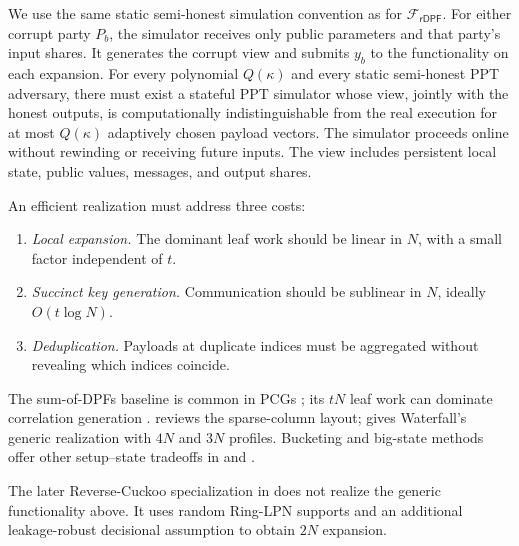 We use the same static semi-honest simulation convention as for
$\mathcal F_{\mathsf{rDPF}}$.  For either corrupt party $P_b$, the simulator
receives only public parameters and that party's input shares.  It generates
the corrupt view and submits $y_b$ to the functionality on each expansion.
For every polynomial $Q(\kappa)$ and every static semi-honest PPT adversary,
there must exist a stateful PPT simulator whose view, jointly with the
honest outputs, is computationally indistinguishable from the real execution
for at most $Q(\kappa)$ adaptively chosen payload vectors.
The simulator proceeds online without rewinding or receiving future inputs.
The view includes persistent local state, public values, messages, and
output shares.

An efficient realization must address three costs:

\begin{enumerate}
    \item \emph{Local expansion.} The dominant leaf work should be linear
    in $N$, with a small factor independent of $t$.
    \item \emph{Succinct key generation.} Communication should be sublinear
    in $N$, ideally $O(t\log N)$.
    \item \emph{Deduplication.} Payloads at duplicate indices must be aggregated
    without revealing which indices coincide.
\end{enumerate}

The sum-of-DPFs baseline is common in PCGs
\cite{boyle2020efficient,foleage,anyField,pcgZ2k}; its $tN$ leaf work can
dominate correlation generation \cite{foleage,libOTe}.
 reviews the sparse-column layout;
 gives Waterfall's generic realization with
$4N$ and $3N$ profiles. Bucketing and big-state methods offer other
setup--state tradeoffs in  and
.

The later Reverse-Cuckoo specialization in 
does not realize the generic functionality above. It uses random Ring-LPN
supports and an additional leakage-robust decisional assumption to obtain
$2N$ expansion.
